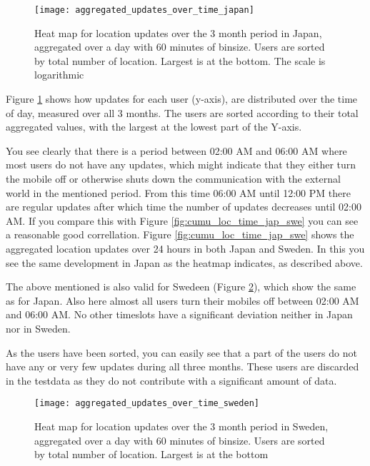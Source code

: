 \begin{figure}[H]
    \hspace*{-0.8cm}
    \centering
    \texttt{[image: aggregated\_updates\_over\_time\_japan]}
    \caption{Heat map for location updates over the 3 month period in Japan, aggregated over a day with 60 minutes of binsize. Users are sorted by total number of location. Largest is at the bottom. The scale is logarithmic}
    \label{fig:agg_heatmap_jap}
\end{figure}
Figure \ref{fig:agg_heatmap_jap} shows how updates for each user (y-axis), are distributed over the time of day, measured over all 3 months. The users are sorted according to their total aggregated values, with the largest at the lowest part of the Y-axis.  

You see clearly that there is a period between 02:00 AM and 06:00 AM where most users do not have any updates, which might indicate that they either turn the mobile off or otherwise shuts down the communication with the external world in the mentioned period. From this time 06:00 AM until 12:00 PM there are regular updates after which time the number of updates decreases until 02:00 AM. If you compare this with Figure \ref{fig:cumu_loc_time_jap_swe} you can see a reasonable good correllation. Figure \ref{fig:cumu_loc_time_jap_swe} shows the  aggregated location updates over 24 hours in both Japan and Sweden. In this you see the same development in Japan as the heatmap indicates, as described above. 

The above mentioned is also valid for Swedeen (Figure \ref{fig:agg_heatmap_swe}), which show the same as for Japan. Also here almost all users turn their mobiles off between 02:00 AM and 06:00 AM. 
No other timeslots have a significant deviation neither in Japan nor in Sweden.  

As the users have been sorted, you can easily see that a part of the users do not have any or very few updates during all three months. These users are discarded in the testdata as they do not contribute with a significant amount of data.  


\begin{figure}[H]
    \hspace*{-0.8cm}
    \centering
    \texttt{[image: aggregated\_updates\_over\_time\_sweden]}
    \caption{Heat map for location updates over the 3 month period in Sweden, aggregated over a day with 60 minutes of binsize. Users are sorted by total number of location. Largest is at the bottom}
    \label{fig:agg_heatmap_swe}
\end{figure}

